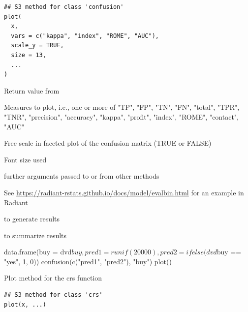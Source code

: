 \documentclass[a4paper]{book}
\begin{document}
%
\begin{Usage}
\begin{verbatim}
## S3 method for class 'confusion'
plot(
  x,
  vars = c("kappa", "index", "ROME", "AUC"),
  scale_y = TRUE,
  size = 13,
  ...
)
\end{verbatim}
\end{Usage}
%
\begin{Arguments}
\begin{ldescription}
\item[\code{x}] Return value from 

\item[\code{vars}] Measures to plot, i.e., one or more of "TP", "FP", "TN", "FN", "total", "TPR", "TNR", "precision", "accuracy", "kappa", "profit", "index", "ROME", "contact", "AUC"

\item[\code{scale\_y}] Free scale in faceted plot of the confusion matrix (TRUE or FALSE)

\item[\code{size}] Font size used

\item[\code{...}] further arguments passed to or from other methods
\end{ldescription}
\end{Arguments}
%
\begin{Details}
See \url{https://radiant-rstats.github.io/docs/model/evalbin.html} for an example in Radiant
\end{Details}
%
\begin{SeeAlso}
 to generate results

 to summarize results
\end{SeeAlso}
%
\begin{Examples}
\begin{ExampleCode}
data.frame(buy = dvd$buy, pred1 = runif(20000), pred2 = ifelse(dvd$buy == "yes", 1, 0)) %
  confusion(c("pred1", "pred2"), "buy") %
  plot()
\end{ExampleCode}
\end{Examples}
%
\begin{Description}
Plot method for the crs function
\end{Description}
%
\begin{Usage}
\begin{verbatim}
## S3 method for class 'crs'
plot(x, ...)
\end{verbatim}
\end{Usage}
\end{document}
